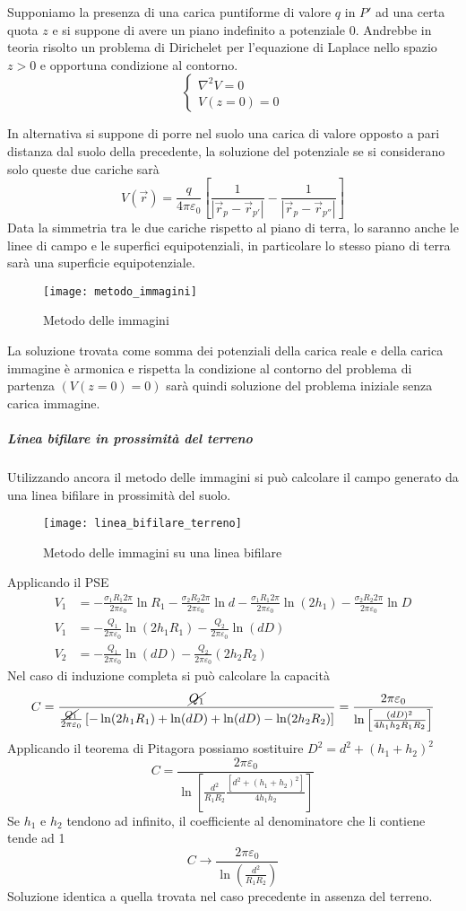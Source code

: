 Supponiamo la presenza di una carica puntiforme di valore $q$ in $P'$ ad una certa quota $z$
e si suppone di avere un piano indefinito a potenziale 0.
Andrebbe in teoria risolto un problema di Dirichelet per l'equazione di Laplace nello spazio
$z>0$ e opportuna condizione al contorno.
$$
\begin{cases}
\nabla^2 V = 0\\
V(z=0)=0
\end{cases}
$$

In alternativa si suppone di porre nel suolo una carica di valore opposto a pari distanza dal suolo
della precedente, la soluzione del potenziale se si considerano solo queste due cariche sarà
$$
V(\vec{r}) = \frac{q}{4 \pi \varepsilon_0} \left[\frac{1}{|\vec{r}_p-\vec{r}_{p'}|}-\frac{1}{|\vec{r}_p-\vec{r}_{p''}|}\right]
$$
Data la simmetria tra le due cariche rispetto al piano di
terra, lo saranno anche le linee di campo e le superfici equipotenziali, in particolare
lo stesso piano di terra sarà una superficie equipotenziale.
\begin{figure}[h!]
\centering
 \texttt{[image: metodo\_immagini]}
\caption{Metodo delle immagini}
\end{figure} 
La soluzione trovata come somma dei potenziali della carica reale e della carica immagine
è armonica e rispetta la condizione al contorno del problema di partenza $(V(z=0)=0)$ sarà
quindi soluzione del problema iniziale senza carica immagine.

\subparagraph{Linea bifilare in prossimità del terreno}
Utilizzando ancora il metodo delle immagini si può calcolare il campo generato da una linea
bifilare in prossimità del suolo.
\begin{figure}[h!]
\centering
 \texttt{[image: linea\_bifilare\_terreno]}
\caption{Metodo delle immagini su una linea bifilare}
\end{figure} 
Applicando il PSE
\begin{align*}
V_1 &= -\frac{\sigma_1 R_1 2\pi}{2\pi\varepsilon_0}\ln R_1 -
\frac{\sigma_2 R_2 2 \pi}{2 \pi \varepsilon_0}\ln d - 
\frac{\sigma_1 R_1 2 \pi}{2\pi \varepsilon_0} \ln(2 h_1) -
\frac{\sigma_2 R_2 2 \pi}{2\pi\varepsilon_0} \ln D \\
V_1 &= -\frac{Q_1}{2\pi\varepsilon_0} \ln(2 h_1 R_1) - 
\frac{Q_2}{2\pi\varepsilon_0} \ln (dD)\\
V_2 &= -\frac{Q_1}{2\pi\varepsilon_0} \ln(dD) - 
\frac{Q_2}{2\pi\varepsilon_0} (2h_2R_2)
\end{align*}
Nel caso di induzione completa si può calcolare la capacità
$$
C = \frac{\cancel{Q_1}}{\frac{\cancel{Q_1}}{2\pi\varepsilon_0}\left[-\ln(2h_1R_1)+\ln(dD)+\ln(dD)-\ln(2h_2R_2)\right]} = 
\frac{2\pi\varepsilon_0}{\ln\left[\frac{(dD)^2}{4h_1h_2R_1R_2}\right]}
$$
Applicando il teorema di Pitagora possiamo sostituire $D^2 = d^2 + (h_1+h_2)^2$
$$
C = \frac{2\pi\varepsilon_0}{\ln\left[\frac{d^2}{R_1R_2} 
\frac{\left[d^2+(h_1+h_2)^2\right]}{4h_1h_2} \right]}
$$
Se $h_1$ e $h_2$ tendono ad infinito, il coefficiente al 
denominatore che li contiene tende ad 1
$$
C \to \frac{2\pi\varepsilon_0}{\ln\left(\frac{d^2}{R_1R_2}\right)}
$$
Soluzione identica a quella trovata nel caso precedente in
assenza del terreno.


